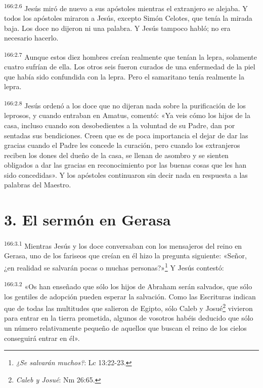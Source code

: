 \par 
\textsuperscript{166:2.6} Jesús miró de nuevo a sus apóstoles mientras el extranjero se alejaba. Y todos los apóstoles miraron a Jesús, excepto Simón Celotes, que tenía la mirada baja. Los doce no dijeron ni una palabra. Y Jesús tampoco habló; no era necesario hacerlo.

\par 
\textsuperscript{166:2.7} Aunque estos diez hombres creían realmente que tenían la lepra, solamente cuatro sufrían de ella. Los otros seis fueron curados de una enfermedad de la piel que había sido confundida con la lepra. Pero el samaritano tenía realmente la lepra.

\par 
\textsuperscript{166:2.8} Jesús ordenó a los doce que no dijeran nada sobre la purificación de los leprosos, y cuando entraban en Amatus, comentó: «Ya veis cómo los hijos de la casa, incluso cuando son desobedientes a la voluntad de su Padre, dan por sentadas sus bendiciones. Creen que es de poca importancia el dejar de dar las gracias cuando el Padre les concede la curación, pero cuando los extranjeros reciben los dones del dueño de la casa, se llenan de asombro y se sienten obligados a dar las gracias en reconocimiento por las buenas cosas que les han sido concedidas». Y los apóstoles continuaron sin decir nada en respuesta a las palabras del Maestro.

\section*{3. El sermón en Gerasa}
\par 
\textsuperscript{166:3.1} Mientras Jesús y los doce conversaban con los mensajeros del reino en Gerasa, uno de los fariseos que creían en él hizo la pregunta siguiente: «Señor, ¿en realidad se salvarán pocas o muchas personas?»\footnote{\textit{¿Se salvarán muchos?}: Lc 13:22-23.} Y Jesús contestó:

\par 
\textsuperscript{166:3.2} «Os han enseñado que sólo los hijos de Abraham serán salvados, que sólo los gentiles de adopción pueden esperar la salvación. Como las Escrituras indican que de todas las multitudes que salieron de Egipto, sólo Caleb y Josué\footnote{\textit{Caleb y Josué}: Nm 26:65.} vivieron para entrar en la tierra prometida, algunos de vosotros habéis deducido que sólo un número relativamente pequeño de aquellos que buscan el reino de los cielos conseguirá entrar en él».

